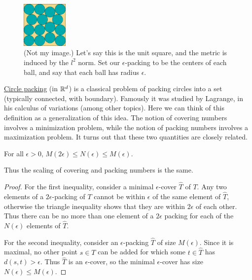 \documentclass[11pt]{article}
\begin{document}
\begin{figure}[ht]
  \centering
  \includegraphics[width=0.2\textwidth]{assets/circle-packing.png}
  \caption{(Not my image.) Let's say this is the unit square, and 
  the metric is induced by the $l^2$ norm. Set our $\epsilon$-packing to be the
  centers of each ball, and say
that each ball has radius $\epsilon$.}
  \label{fig:circle-packing}
\end{figure}
\href{https://en.wikipedia.org/wiki/Circle\_packing}{Circle packing} (in $\mathbb{R}^d$) is a classical problem of packing circles into 
a set (typically connected, with boundary). Famously it was studied by
Lagrange, in his calculus of variations (among other topics). Here we can think
of this definition
as a generalization of this idea.
The notion of covering numbers involves a minimization problem, while the notion of 
packing numbers involves a maximization problem. It turns out that these two quantities are closely
related.
\begin{theorem}
  For all $\epsilon > 0$, $M(2\epsilon) \le N(\epsilon) \le M(\epsilon)$.
\end{theorem}
Thus the scaling of covering and packing numbers is the same.
\begin{proof}
  For the first inequality, consider a minimal $\epsilon$-cover $\widehat{T}$ of $T$. 
  Any two elements of a $2\epsilon$-packing of $T$ cannot be within $\epsilon$ of the same
  element of $\widehat{T}$, otherwise the triangle inequality shows that they are
  within $2\epsilon$ of each other.
  Thus there can be no more than one  element of a $2\epsilon$ packing for each of the
  $N(\epsilon)$ elements of $\widehat{T}$.

  For the second inequality, consider an $\epsilon$-packing $\widehat{T}$ of size $M(\epsilon)$.
  Since it is maximal, no other point $s \in T$ can be added for which some $t\in \widehat{T}$ has
  $d(s,t) > \epsilon$. Thus $\widehat{T}$ is an $\epsilon$-cover, so 
  the minimal $\epsilon$-cover has size $N(\epsilon) \le M(\epsilon)$.
\end{proof}
\end{document}
